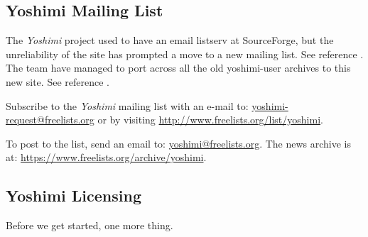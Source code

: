 \documentclass[
 11pt,
 twoside,
 a4paper,
 final                                 %
]{article}
\begin{document}
\subsection{Yoshimi Mailing List}
\label{subsec:introduction_mailing_list}

   The \textsl{Yoshimi} project used to have an email listserv at
   SourceForge, but the unreliability of the site has prompted a move to a
   new mailing list.  See reference \cite{yoshiminews}.  The team have
   managed to port across all the old yoshimi-user archives to this new
   site.  See reference \cite{yoshiminewsarchive}.

   Subscribe to the \textsl{Yoshimi} mailing list with an e-mail to:
   \url{yoshimi-request@freelists.org} or by visiting 
   \url{http://www.freelists.org/list/yoshimi}.

   To post to the list, send an email to: \url{yoshimi@freelists.org}.
   The news archive is at: \url{https://www.freelists.org/archive/yoshimi}.

\subsection{Yoshimi Licensing}
\label{subsec:introduction_yoshimi_licensing}

   Before we get started, one more thing.
\end{document}
